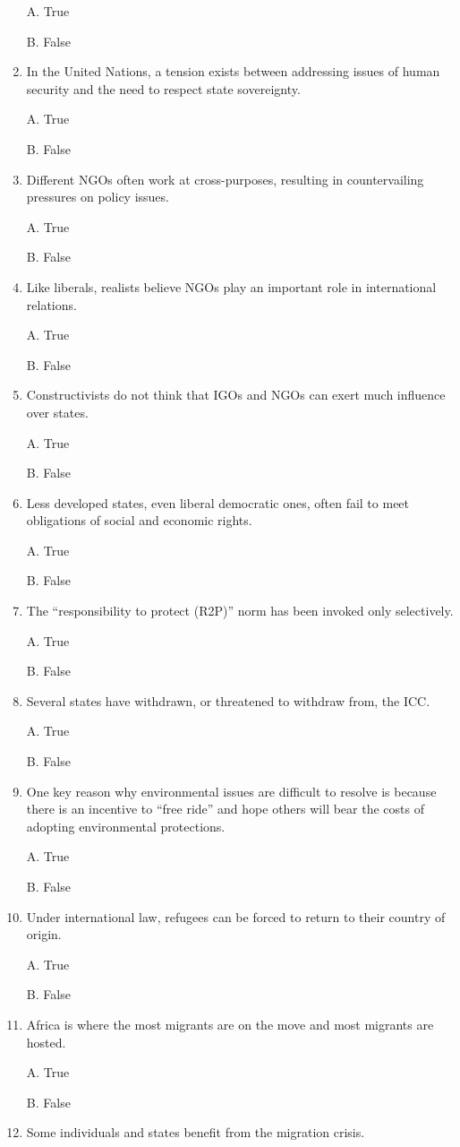 \documentclass[
]{book}
\begin{document}
\begin{enumerate}
  A. True

  B. False
\item
  In the United Nations, a tension exists between addressing issues of human security and the need to respect state sovereignty.

  A. True

  B. False
\item
  Different NGOs often work at cross-purposes, resulting in countervailing pressures on policy issues.

  A. True

  B. False
\item
  Like liberals, realists believe NGOs play an important role in international relations.

  A. True

  B. False
\item
  Constructivists do not think that IGOs and NGOs can exert much influence over states.

  A. True

  B. False
\item
  Less developed states, even liberal democratic ones, often fail to meet obligations of social and economic rights.

  A. True

  B. False
\item
  The ``responsibility to protect (R2P)'' norm has been invoked only selectively.

  A. True

  B. False
\item
  Several states have withdrawn, or threatened to withdraw from, the ICC.

  A. True

  B. False
\item
  One key reason why environmental issues are difficult to resolve is because there is an incentive to ``free ride'' and hope others will bear the costs of adopting environmental protections.

  A. True

  B. False
\item
  Under international law, refugees can be forced to return to their country of origin.

  A. True

  B. False
\item
  Africa is where the most migrants are on the move and most migrants are hosted.

  A. True

  B. False
\item
  Some individuals and states benefit from the migration crisis.


\end{enumerate}
\end{document}
